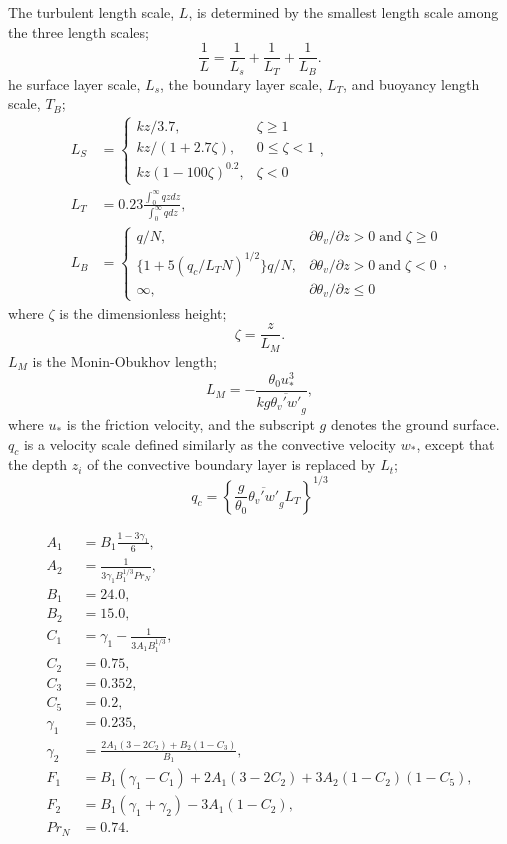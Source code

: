 The turbulent length scale, $L$, is determined by the smallest length scale among the three length scales;
\begin{equation}
  \frac{1}{L} = \frac{1}{L_s} + \frac{1}{L_T} + \frac{1}{L_B}.
\end{equation}
he surface layer scale, $L_s$, the boundary layer scale, $L_T$, and buoyancy length scale, $T_B$;
\begin{align}
  L_S &= \left\{
  \begin{array}{ll}
    kz/3.7, & \zeta \ge 1 \\
    kz/(1+2.7\zeta), & 0 \le \zeta < 1 \\
    kz(1-100\zeta)^{0.2}, & \zeta < 0
  \end{array}
  \right. , \\
  L_T &= 0.23\frac{\int_0^\infty qz dz}{\int_0^\infty q dz}, \\
  L_B &= \left\{
  \begin{array}{ll}
    q/N,                      & \partial \theta_v/\partial z > 0 \;\mathrm{and}\; \zeta \ge 0 \\
    \{1+5(q_c/L_TN)^{1/2}\}q/N, & \partial \theta_v/\partial z > 0 \:\mathrm{and}\; \zeta < 0 \\
    \infty, & \partial \theta_v/\partial z \le 0
  \end{array}
  \right. ,
\end{align}
where $\zeta$ is the dimensionless height;
\begin{equation}
  \zeta = \frac{z}{L_M}.
\end{equation}
$L_M$ is the Monin-Obukhov length;
\begin{equation}
  L_M = -\frac{\theta_0 u_*^3}{kg\overline{\theta_v'w'}_g},
\end{equation}
where $u_*$ is the friction velocity, and the subscript $g$ denotes the ground surface.
$q_c$ is a velocity scale defined similarly as the convective velocity $w_*$, except that the depth $z_i$ of the convective boundary layer is replaced by $L_t$;
\begin{equation}
  q_c = \left\{\frac{g}{\theta_0}\overline{\theta_v' w'}_gL_T\right\}^{1/3}
\end{equation}


\begin{align}
  A_1 &= B_1\frac{1-3\gamma_1}{6}, \\
  A_2 &= \frac{1}{3\gamma_1 B_1^{1/3} Pr_N}, \\
  B_1 &= 24.0, \\
  B_2 &= 15.0, \\
  C_1 &= \gamma_1 - \frac{1}{3A_1B_1^{1/3}}, \\
  C_2 &= 0.75, \\
  C_3 &= 0.352, \\
  C_5 &= 0.2, \\
  \gamma_1 &= 0.235, \\
  \gamma_2 &= \frac{2A_1(3-2C_2)+B_2(1-C_3)}{B_1}, \\
  F_1 &= B_1(\gamma_1-C_1)+2A_1(3-2C_2)+3A_2(1-C_2)(1-C_5), \\
  F_2 &= B_1(\gamma_1+\gamma_2)-3A_1(1-C_2), \\
  Pr_N &= 0.74.
\end{align}


